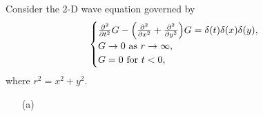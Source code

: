 \documentclass[12pt]{report}
\begin{document}
\begin{solution}

    \noindent
    Consider the 2-D wave equation governed by
    \begin{equation}   
        \begin{cases}\label{wave}
            \frac{\partial^{2} }{\partial t^{2}}G-{\left(\frac{\partial^{2} }{\partial x^{2}} + \frac{\partial^{2} }{\partial y^{2}}\right)}G = \delta(t)\delta(x)\delta(y),\\
            G \to 0 ~\text{as}~ r \to \infty,\\
            G = 0 ~\text{for}~ t<0,
        \end{cases}
    \end{equation}
    where $r^2 = x^2 + y^2$.

    
    
    \begin{enumerate}
        \item [(a)]
        

\end{enumerate}
\end{solution}
\end{document}
